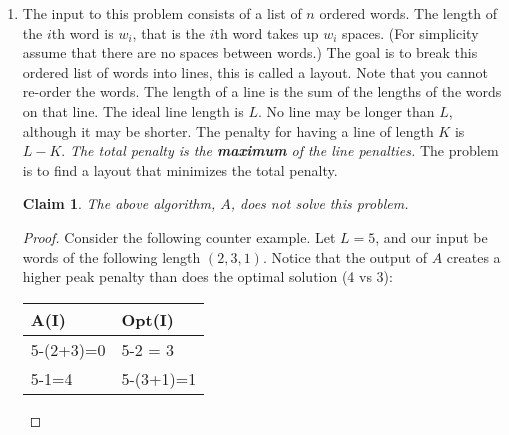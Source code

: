 \documentclass{article}
\newtheorem{thm}{Claim}
\begin{document}
\begin{enumerate}[label=(\alph*)]
\begin{proof}
        	With this contradiction, we have that $A$ is correct.
        \end{proof}
        
        
        \item The input to this problem consists of a list of $n$ ordered words.
        The length of the $i$th word is $w_i$, that is the $i$th word takes up $w_i$ spaces.
        (For simplicity assume that there are no spaces between words.)
        The goal is to break this ordered list of words into lines, this is called a layout.
        Note that you cannot re-order the words.
        The length of a line is the sum of the lengths of the words on that line.
        The ideal line length is $L$.
        No line may be longer than $L$, although it may be shorter.
        The penalty for having a line of length $K$ is $L - K$.
        \emph{The total penalty is the \textbf{maximum} of the line penalties.}
        The problem is to find a layout that minimizes the total penalty.
        
		\begin{thm}
			The above algorithm, $A$, does not solve this problem.
		\end{thm}
		\begin{proof}
			Consider the following counter example.
			Let $L = 5$, and our input be words of the following length $(2,3,1)$.
			Notice that the output of $A$ creates a higher peak penalty than does the optimal solution (4 vs 3):
			\begin{center}
			\begin{tabular}{l | l}
				A(I) & Opt(I)\\
				\hline
				5-(2+3)=0 & 5-2 = 3\\
				5-1=4     & 5-(3+1)=1\\
			\end{tabular}
			\end{center}
		\end{proof}
        
        
    \end{enumerate}
\end{document}
